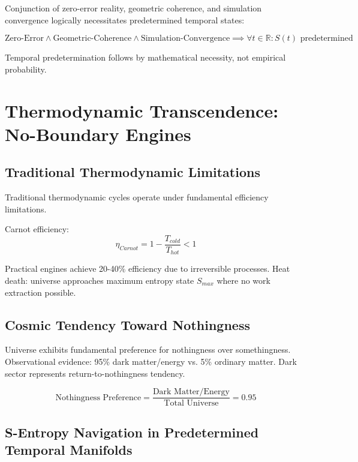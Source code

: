 \documentclass[12pt,a4paper]{article}
\begin{document}
Conjunction of zero-error reality, geometric coherence, and simulation convergence logically necessitates predetermined temporal states:

\begin{equation}
\text{Zero-Error} \land \text{Geometric-Coherence} \land \text{Simulation-Convergence} \implies \forall t \in \mathbb{R}: S(t) \text{ predetermined}
\end{equation}

Temporal predetermination follows by mathematical necessity, not empirical probability.

\section{Thermodynamic Transcendence: No-Boundary Engines}

\subsection{Traditional Thermodynamic Limitations}

Traditional thermodynamic cycles operate under fundamental efficiency limitations.

Carnot efficiency:
\begin{equation}
\eta_{Carnot} = 1 - \frac{T_{cold}}{T_{hot}} < 1
\end{equation}

Practical engines achieve 20-40\% efficiency due to irreversible processes. Heat death: universe approaches maximum entropy state $S_{max}$ where no work extraction possible.

\subsection{Cosmic Tendency Toward Nothingness}

Universe exhibits fundamental preference for nothingness over somethingness. Observational evidence: 95\% dark matter/energy vs. 5\% ordinary matter. Dark sector represents return-to-nothingness tendency.

\begin{equation}
\text{Nothingness Preference} = \frac{\text{Dark Matter/Energy}}{\text{Total Universe}} = 0.95
\end{equation}

\subsection{S-Entropy Navigation in Predetermined Temporal Manifolds}
\end{document}
